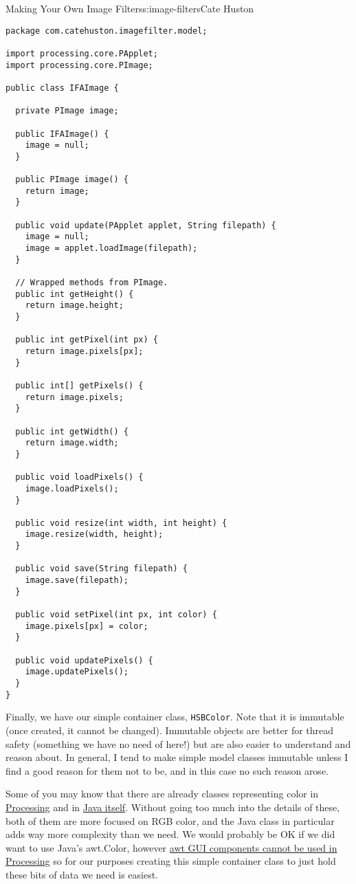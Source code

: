 \begin{aosachapter}{Making Your Own Image Filters}{s:image-filters}{Cate Huston}
\begin{verbatim}
package com.catehuston.imagefilter.model;

import processing.core.PApplet;
import processing.core.PImage;

public class IFAImage {

  private PImage image;

  public IFAImage() {
    image = null;
  }

  public PImage image() {
    return image;
  }

  public void update(PApplet applet, String filepath) {
    image = null;
    image = applet.loadImage(filepath);
  }

  // Wrapped methods from PImage.
  public int getHeight() {
    return image.height;
  }

  public int getPixel(int px) {
    return image.pixels[px];
  }

  public int[] getPixels() {
    return image.pixels;
  }

  public int getWidth() {
    return image.width;
  }

  public void loadPixels() {
    image.loadPixels();
  }

  public void resize(int width, int height) {
    image.resize(width, height);
  }

  public void save(String filepath) {
    image.save(filepath);
  }

  public void setPixel(int px, int color) {
    image.pixels[px] = color;
  }

  public void updatePixels() {
    image.updatePixels();
  }
}
\end{verbatim}

Finally, we have our simple container class, \texttt{HSBColor}. Note
that it is immutable (once created, it cannot be changed). Immutable
objects are better for thread safety (something we have no need of
here!) but are also easier to understand and reason about. In general, I
tend to make simple model classes immutable unless I find a good reason
for them not to be, and in this case no such reason arose.

Some of you may know that there are already classes representing color
in
\href{https://www.processing.org/reference/color_datatype.html}{Processing}
and in
\href{https://docs.oracle.com/javase/7/docs/api/java/awt/Color.html}{Java
itself}. Without going too much into the details of these, both of them
are more focused on RGB color, and the Java class in particular adds way
more complexity than we need. We would probably be OK if we did want to
use Java's awt.Color, however
\href{http://processing.org/reference/javadoc/core/processing/core/PApplet.html}{awt
GUI components cannot be used in Processing} so for our purposes
creating this simple container class to just hold these bits of data we
need is easiest.


\end{aosachapter}

